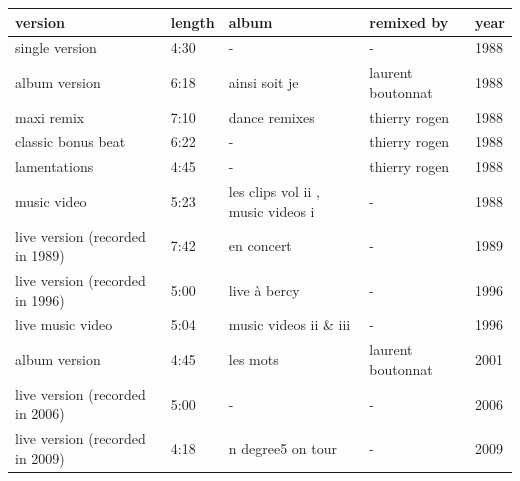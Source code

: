 \documentclass{article}
\begin{document}
\begin{tabular}{lllll}
\toprule
version & length & album & remixed by & year \\
\midrule
single version & 4:30 & - & - & 1988 \\
album version & 6:18 & ainsi soit je & laurent boutonnat & 1988 \\
maxi remix & 7:10 & dance remixes & thierry rogen & 1988 \\
classic bonus beat & 6:22 & - & thierry rogen & 1988 \\
lamentations & 4:45 & - & thierry rogen & 1988 \\
music video & 5:23 & les clips vol ii , music videos i & - & 1988 \\
live version (recorded in 1989) & 7:42 & en concert & - & 1989 \\
live version (recorded in 1996) & 5:00 & live à bercy & - & 1996 \\
live music video & 5:04 & music videos ii \& iii & - & 1996 \\
album version & 4:45 & les mots & laurent boutonnat & 2001 \\
live version (recorded in 2006) & 5:00 & - & - & 2006 \\
live version (recorded in 2009) & 4:18 & n degree5 on tour & - & 2009 \\
\bottomrule
\end{tabular}
\end{document}
